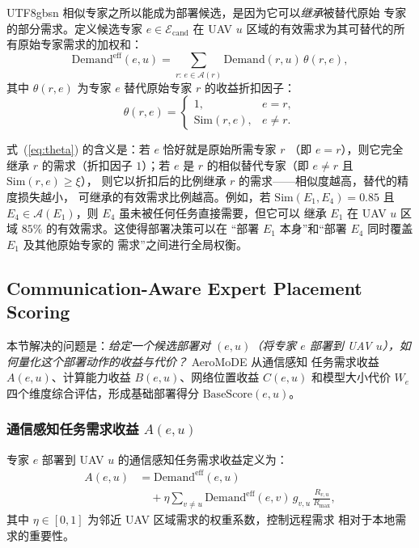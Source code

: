 \documentclass[conference]{IEEEtran}
\begin{document}
\begin{CJK*}{UTF8}{gbsn}
相似专家之所以能成为部署候选，是因为它可以\emph{继承}被替代原始
专家的部分需求。定义候选专家 $e\in\mathcal{E}_{\mathrm{cand}}$ 在
UAV $u$ 区域的有效需求为其可替代的所有原始专家需求的加权和：
\begin{equation}
\mathrm{Demand}^{\mathrm{eff}}(e,u) =
\sum_{r:\,e\in\mathcal{A}(r)} \!\! \mathrm{Demand}(r,u) \, \theta(r,e),
\label{eq:demand_eff}
\end{equation}
其中 $\theta(r,e)$ 为专家 $e$ 替代原始专家 $r$ 的收益折扣因子：
\begin{equation}
\theta(r,e) =
\begin{cases}
1,                     & e = r,\\[4pt]
\mathrm{Sim}(r,e),     & e \neq r.
\end{cases}
\label{eq:theta}
\end{equation}

式~(\ref{eq:theta}) 的含义是：若 $e$ 恰好就是原始所需专家 $r$
（即 $e=r$），则它完全继承 $r$ 的需求（折扣因子 $1$）；若 $e$ 是
$r$ 的相似替代专家（即 $e\neq r$ 且 $\mathrm{Sim}(r,e)\ge\xi$），
则它以折扣后的比例继承 $r$ 的需求——相似度越高，替代的精度损失越小，
可继承的有效需求比例越高。例如，若 $\mathrm{Sim}(E_1,E_4)=0.85$ 且
$E_4\in\mathcal{A}(E_1)$，则 $E_4$ 虽未被任何任务直接需要，但它可以
继承 $E_1$ 在 UAV $u$ 区域 $85\%$ 的有效需求。这使得部署决策可以在
``部署 $E_1$ 本身''和``部署 $E_4$ 同时覆盖 $E_1$ 及其他原始专家的
需求''之间进行全局权衡。

\subsection{Communication-Aware Expert Placement Scoring}
\label{sec:placement_scoring}

本节解决的问题是：\emph{给定一个候选部署对 $(e,u)$（将专家 $e$ 部署到
UAV $u$），如何量化这个部署动作的收益与代价？} AeroMoDE 从通信感知
任务需求收益 $A(e,u)$、计算能力收益 $B(e,u)$、网络位置收益 $C(e,u)$
和模型大小代价 $W_e$ 四个维度综合评估，形成基础部署得分
$\mathrm{BaseScore}(e,u)$。

\subsubsection{通信感知任务需求收益 \texorpdfstring{$A(e,u)$}{A(e,u)}}

专家 $e$ 部署到 UAV $u$ 的通信感知任务需求收益定义为：
\begin{equation}
\begin{aligned}
A(e,u) &= \mathrm{Demand}^{\mathrm{eff}}(e,u) \\
&\quad + \eta \sum_{v\neq u} \mathrm{Demand}^{\mathrm{eff}}(e,v)\,
g_{v,u}\,\frac{R_{v,u}}{R_{\max}},
\end{aligned}
\label{eq:A}
\end{equation}
其中 $\eta\in[0,1]$ 为邻近 UAV 区域需求的权重系数，控制远程需求
相对于本地需求的重要性。


\end{CJK*}
\end{document}
